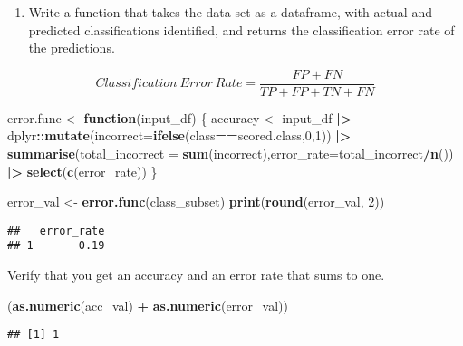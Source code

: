 \documentclass[
]{article}
\newenvironment{Shaded}{\begin{snugshade}}{\end{snugshade}}
\newcommand{\AttributeTok}[1]{\textcolor[rgb]{0.13,0.29,0.53}{#1}}
\newcommand{\ControlFlowTok}[1]{\textcolor[rgb]{0.13,0.29,0.53}{\textbf{#1}}}
\newcommand{\DecValTok}[1]{\textcolor[rgb]{0.00,0.00,0.81}{#1}}
\newcommand{\FunctionTok}[1]{\textcolor[rgb]{0.13,0.29,0.53}{\textbf{#1}}}
\newcommand{\NormalTok}[1]{#1}
\newcommand{\OtherTok}[1]{\textcolor[rgb]{0.56,0.35,0.01}{#1}}
\newcommand{\SpecialCharTok}[1]{\textcolor[rgb]{0.81,0.36,0.00}{\textbf{#1}}}
\providecommand{\tightlist}{%
  \setlength{\itemsep}{0pt}\setlength{\parskip}{0pt}}
\begin{document}
\begin{enumerate}
\def\labelenumi{\arabic{enumi}.}
\setcounter{enumi}{3}
\tightlist
\item
  Write a function that takes the data set as a dataframe, with actual
  and predicted classifications identified, and returns the
  classification error rate of the predictions.
\end{enumerate}

\[Classification\ Error\ Rate = \frac{FP + FN}{TP + FP + TN + FN}\]

\begin{Shaded}
\begin{Highlighting}[]
\NormalTok{error.func }\OtherTok{\textless{}{-}} \ControlFlowTok{function}\NormalTok{(input\_df) \{}
\NormalTok{    accuracy }\OtherTok{\textless{}{-}}\NormalTok{ input\_df }\SpecialCharTok{|\textgreater{}}\NormalTok{ dplyr}\SpecialCharTok{::}\FunctionTok{mutate}\NormalTok{(}\AttributeTok{incorrect=}\FunctionTok{ifelse}\NormalTok{(class}\SpecialCharTok{==}\NormalTok{scored.class,}\DecValTok{0}\NormalTok{,}\DecValTok{1}\NormalTok{)) }\SpecialCharTok{|\textgreater{}} \FunctionTok{summarise}\NormalTok{(}\AttributeTok{total\_incorrect =} \FunctionTok{sum}\NormalTok{(incorrect),}\AttributeTok{error\_rate=}\NormalTok{total\_incorrect}\SpecialCharTok{/}\FunctionTok{n}\NormalTok{()) }\SpecialCharTok{|\textgreater{}} \FunctionTok{select}\NormalTok{(}\FunctionTok{c}\NormalTok{(error\_rate))}
\NormalTok{\}}

\NormalTok{error\_val }\OtherTok{\textless{}{-}} \FunctionTok{error.func}\NormalTok{(class\_subset)}
\FunctionTok{print}\NormalTok{(}\FunctionTok{round}\NormalTok{(error\_val, }\DecValTok{2}\NormalTok{))}
\end{Highlighting}
\end{Shaded}

\begin{verbatim}
##   error_rate
## 1       0.19
\end{verbatim}

Verify that you get an accuracy and an error rate that sums to one.

\begin{Shaded}
\begin{Highlighting}[]
\NormalTok{(}\FunctionTok{as.numeric}\NormalTok{(acc\_val) }\SpecialCharTok{+} \FunctionTok{as.numeric}\NormalTok{(error\_val))}
\end{Highlighting}
\end{Shaded}

\begin{verbatim}
## [1] 1
\end{verbatim}
\end{document}
